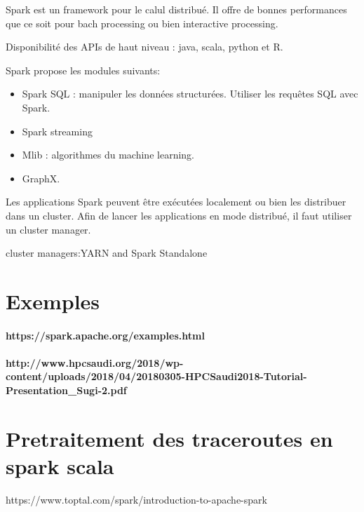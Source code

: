 \documentclass[]{report}
\title{}
\author{}
\begin{document}
\maketitle


Spark est un framework pour le calul distribué. Il offre de bonnes performances que ce soit pour bach processing ou bien interactive processing.

Disponibilité des APIs de haut niveau : java, scala, python et R.

Spark propose les modules suivants:


\begin{itemize}
	\item Spark SQL : manipuler les données structurées. Utiliser les requêtes SQL avec Spark.
	\item Spark streaming 
	\item Mlib : algorithmes du machine learning.
	\item GraphX.
\end{itemize}

Les applications Spark peuvent être exécutées localement ou bien les distribuer dans un cluster. Afin de lancer les applications en mode distribué, il faut utiliser un cluster manager.

cluster managers:YARN and Spark Standalone

\section{Exemples } 

\paragraph{https://spark.apache.org/examples.html}

\paragraph{http://www.hpcsaudi.org/2018/wp-content/uploads/2018/04/20180305-HPCSaudi2018-Tutorial-Presentation_Sugi-2.pdf}

\section{Pretraitement des traceroutes en spark  scala}

https://www.toptal.com/spark/introduction-to-apache-spark














\begin{abstract}
\end{abstract}
\end{document}
